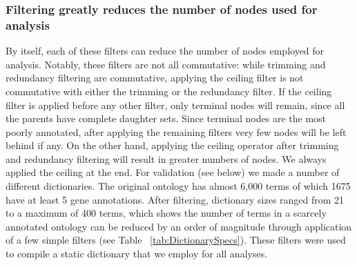 \documentclass{bmcart}
\begin{document}
\subsubsection*{Filtering greatly reduces the number of nodes used for analysis}
	By itself, each of these filters can reduce the number of nodes employed for analysis. Notably, these filters are not all commutative: while trimming and redundancy filtering are commutative, applying the ceiling filter is not commutative with either the trimming or the redundancy filter. If the ceiling filter is  applied before any other filter, only terminal nodes will remain, since all the parents have complete daughter sets. Since terminal nodes are the most poorly annotated, after applying the remaining filters very few nodes will be left behind if any. On the other hand, applying the ceiling operator after trimming and redundancy filtering  will result in greater numbers of nodes. We always applied the ceiling at the end. For validation (see below) we made a number of different dictionaries. The original ontology has almost 6,000 terms of which 1675 have at least 5 gene annotations. After filtering, dictionary sizes ranged from 21 to a maximum of 400 terms, which shows the number of terms in a scarcely annotated ontology can be reduced by an order of magnitude through application of a few simple filters (see Table ~\ref{tab:DictionarySpecs}). These filters were used to compile a static dictionary that we employ for all analyses.
\end{document}

